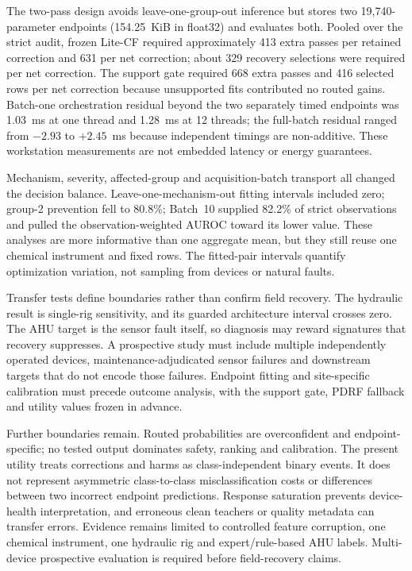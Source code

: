 \documentclass[11pt]{article}
\begin{document}
The two-pass design avoids leave-one-group-out inference but stores two 19,740-parameter endpoints (154.25~KiB in float32) and evaluates both. Pooled over the strict audit, frozen Lite-CF required approximately 413 extra passes per retained correction and 631 per net correction; about 329 recovery selections were required per net correction. The support gate required 668 extra passes and 416 selected rows per net correction because unsupported fits contributed no routed gains. Batch-one orchestration residual beyond the two separately timed endpoints was 1.03~ms at one thread and 1.28~ms at 12 threads; the full-batch residual ranged from $-2.93$ to $+2.45$~ms because independent timings are non-additive. These workstation measurements are not embedded latency or energy guarantees.

Mechanism, severity, affected-group and acquisition-batch transport all changed the decision balance. Leave-one-mechanism-out fitting intervals included zero; group-2 prevention fell to 80.8\%; Batch~10 supplied 82.2\% of strict observations and pulled the observation-weighted AUROC toward its lower value. These analyses are more informative than one aggregate mean, but they still reuse one chemical instrument and fixed rows. The fitted-pair intervals quantify optimization variation, not sampling from devices or natural faults.

Transfer tests define boundaries rather than confirm field recovery. The hydraulic result is single-rig sensitivity, and its guarded architecture interval crosses zero. The AHU target is the sensor fault itself, so diagnosis may reward signatures that recovery suppresses. A prospective study must include multiple independently operated devices, maintenance-adjudicated sensor failures and downstream targets that do not encode those failures. Endpoint fitting and site-specific calibration must precede outcome analysis, with the support gate, PDRF fallback and utility values frozen in advance.

Further boundaries remain. Routed probabilities are overconfident and endpoint-specific; no tested output dominates safety, ranking and calibration. The present utility treats corrections and harms as class-independent binary events. It does not represent asymmetric class-to-class misclassification costs or differences between two incorrect endpoint predictions. Response saturation prevents device-health interpretation, and erroneous clean teachers or quality metadata can transfer errors. Evidence remains limited to controlled feature corruption, one chemical instrument, one hydraulic rig and expert/rule-based AHU labels. Multi-device prospective evaluation is required before field-recovery claims.
\end{document}
